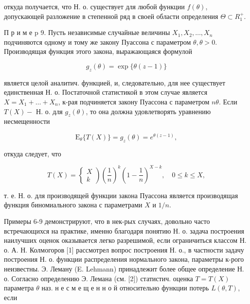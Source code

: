 \documentclass[10pt]{article}
\begin{document}
откуда получается, что Н. о. существует для любой функции $f(\theta)$, допускающей разложение в степенной ряд в своей области определения $\Theta \subset R_{1}^{+}$.



П р и м е p 9. Пусть независимые случайные величины $X_{1}, X_{2}, \ldots, X_{n}$ подчиняются одному и тому же закону Пуассона с параметром $\theta, \theta>0$. Производящая функция этого закона, выражающаяся формулой



\[

g_{z}(\theta)=\exp \{\theta(z-1)\}

\]



является целой аналитич. функцией, и, следовательно, для нее существует единственная Н. о. Постаточной статистикой в этом случае является $X=X_{1}+\ldots+X_{n}$, к-рая подчиняется закону Пуассона с параметром $n \theta$. Если $T(X)-$ Н. о. для $g_{z}(\theta)$, то она должна удовлетворять уравнению несмещенности



\[

\mathrm{E}_{\theta}\{T(X)\}=g_{z}(\theta)=e^{\theta(z-1)},

\]



откуда следует, что



\[

T(X)=\left\{\begin{array}{c}

X \\

k

\end{array}\right)\left(\frac{1}{n}\right)^{k}\left(1-\frac{1}{n}\right)^{X-k}, \quad 0 \leqslant k \leqslant X,

\]



т. е. Н. о. для производящей функции закона Пуассона является производящая функция биномиального закона с параметрами $X$ и $1 / n$.



Примеры 6-9 демонстрируют, что в нек-рых случаях, довольно часто встречающихся на практике, именно благодаря понятию Н. о. задача построения наилучших оценок оказывается легко разрешимой, если ограничиться классом Н. о. А. Н. Колмогоров [1] рассмотрел вопрос построения Н. о., в частности задачу построения Н. о. функции распределения нормального закона, параметры к-рого неизвестны. Э. Леману (E. Lehmann) принадлежит более общее определение Н. о. Согласно определению Э. Лемана (см. [2]) статистич. оценка $T=T(X)$ параметра $\theta$ наз. н е с м е щ е н н о й относительно функции потерь $L(\theta, T)$, если
\end{document}
